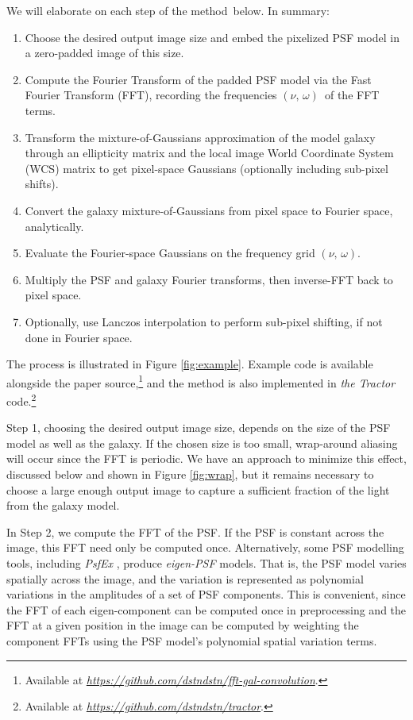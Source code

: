 \documentclass[11pt,preprint]{aastex}
\newcommand{\niceurl}[1]{\href{#1}{\textsl{#1}}}
\newcommand{\project}[1]{\textsl{#1}}
\newcommand{\trick}{method}
\newcommand{\pixelfreqs}{$(\nu,\, \omega)$}
\begin{document}
We will elaborate on each step of the \trick\ below.  In summary:
\begin{enumerate}
\item Choose the desired output image size and embed the pixelized PSF
  model in a zero-padded image of this size.
\item Compute the Fourier Transform of the padded PSF model via the
  Fast Fourier Transform (FFT),
  recording the frequencies \pixelfreqs\ of the FFT terms.
\item Transform the mixture-of-Gaussians approximation of the model
  galaxy through an ellipticity matrix and the local image World
  Coordinate System (WCS) matrix to get pixel-space Gaussians
  (optionally including sub-pixel shifts).
\item Convert the galaxy mixture-of-Gaussians from pixel space to Fourier space,
  analytically.
\item Evaluate the Fourier-space Gaussians on the frequency grid \pixelfreqs.
\item Multiply the PSF and galaxy Fourier transforms, then inverse-FFT
  back to pixel space.
\item Optionally, use Lanczos interpolation to perform sub-pixel shifting, if not
  done in Fourier space.
\end{enumerate}

The process is illustrated in Figure \ref{fig:example}.  Example code
is available alongside the paper source,\footnote{ Available at
  \niceurl{https://github.com/dstndstn/fft-gal-convolution}.}  and the
method is also implemented in \project{the Tractor} code.\footnote{%
  Available at
  \niceurl{https://github.com/dstndstn/tractor}.}

Step 1, choosing the desired output image size, depends on the size of
the PSF model as well as the galaxy.  If the chosen size is too small,
wrap-around aliasing will occur since the FFT is periodic.  We have an
approach to minimize this effect, discussed below and shown in Figure
\ref{fig:wrap}, but it remains necessary to choose a large enough
output image to capture a sufficient fraction of the light from the
galaxy model.

In Step 2, we compute the FFT of the PSF.  If the PSF is constant
across the image, this FFT need only be computed once.  Alternatively,
some PSF modelling tools, including \project{PsfEx} \citep{psfex},
produce \emph{eigen-PSF} models.  That is, the PSF model varies
spatially across the image, and the variation is represented as
polynomial variations in the amplitudes of a set of PSF components.
This is convenient, since the FFT of each eigen-component can be
computed once in preprocessing and the FFT at a given position in the
image can be computed by weighting the component FFTs using the PSF
model's polynomial spatial variation terms.
\end{document}
